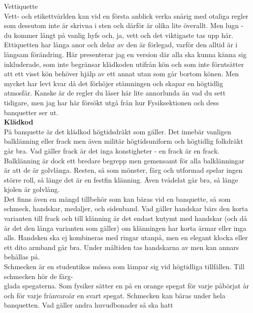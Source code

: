 \documentclass[a6paper,12pt]{article}
\begin{document}
\newpage
\setlength{\oddsidemargin}{-0.57in}
\noindent %
\Large Vettiquette\\
\footnotesize Vett- och etikettvärlden kan vid en första anblick verka 
snårig med otaliga regler som dessutom inte är skrivna i sten och 
därför är olika lite överallt. Men lugn - du kommer långt på vanlig 
hyfs och, ja, vett och det viktigaste tas upp här. Ettiquetten har 
långa anor och delar av den är förlegad, varför den alltid är i 
långsam förändring. Här presenterar jag en version där alla ska kunna 
känna sig inkluderade, som inte begränsar klädkoden utifrån kön och 
som inte förutsätter att ett visst kön behöver hjälp av ett annat 
utan som går bortom könen. Men mycket har levt kvar då det förhöjer 
stämningen och skapar en högtidlig atmosfär. Kanske är de regler du läser 
här lite annorlunda än vad du sett tidigare, men jag har här försökt 
utgå från hur Fysiksektionen och dess banquetter ser ut.\\
\normalsize\textbf{Klädkod}\\
\footnotesize På banquette är det klädkod högtidsdräkt som gäller. 
Det innebär vanligen balklänning eller frack men även militär högtidsuniform 
och högtidlig folkdräkt går bra. Vad gäller frack är det inga konstigheter 
- en frack är en frack. Balklänning är dock ett bredare begrepp men 
gemensamt för alla balklänningar är att de är golvlånga. Resten, så 
som mönster, färg och utformad spelar ingen större roll, så länge det 
är en festfin klänning. Även tvådelat går bra, så länge kjolen är golvlång.\\
Det finns även en mängd tillbehör som kan bäras vid en banquette, 
så som schmeck, handskar, medaljer, och sidenband. Vad gäller handskar bärs den korta 
\newpage
\setlength{\oddsidemargin}{-0.37in}
\noindent
varianten till frack och till klänning är det endast kutymt med handskar 
(och då är det den långa varianten som gäller) om klänningen har korta 
ärmar eller inga alls. Handsken ska ej kombineras med ringar utanpå, 
men en elegant klocka eller ett dito armband går bra. Under måltiden 
tas handskarna av men kan annars behållas på.\\
Schmecken är en studentikos mössa som lämpar sig vid högtidliga 
tillfällen. Till schmecken hör de färg-\\
glada spegaterna. Som fysiker sätter en på en orange spegat för 
varje påbörjat år och för varje frånvaroår en svart spegat. Schmecken kan 
bäras under hela banquetten. Vad gäller andra huvudbonader så ska hatt 
\end{document}
